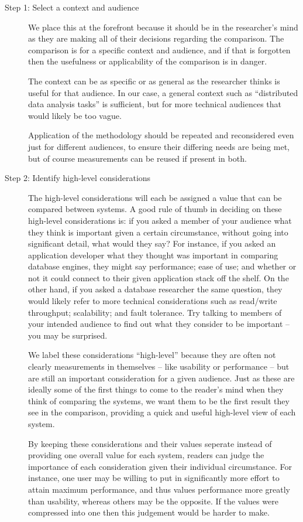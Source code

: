   \begin{description}
    \item[Step 1: Select a context and audience]
      We place this at the forefront because it should be in the researcher's mind as they are making all of their decisions regarding the comparison. The comparison is for a specific context and audience, and if that is forgotten then the usefulness or applicability of the comparison is in danger.
      
      The context can be as specific or as general as the researcher thinks is useful for that audience. In our case, a general context such as ``distributed data analysis tasks'' is sufficient, but for more technical audiences that would likely be too vague.
      
      Application of the methodology should be repeated and reconsidered even just for different audiences, to ensure their differing needs are being met, but of course measurements can be reused if present in both.

    \item[Step 2: Identify high-level considerations]
      The high-level considerations will each be assigned a value that can be compared between systems. A good rule of thumb in deciding on these high-level considerations is: if you asked a member of your audience what they think is important given a certain circumstance, without going into significant detail, what would they say? For instance, if you asked an application developer what they thought was important in comparing database engines, they might say performance; ease of use; and whether or not it could connect to their given application stack off the shelf. On the other hand, if you asked a database researcher the same question, they would likely refer to more technical considerations such as read/write throughput; scalability; and fault tolerance. Try talking to members of your intended audience to find out what they consider to be important -- you may be surprised.
      
      We label these considerations ``high-level'' because they are often not clearly measurements in themselves -- like usability or performance -- but are still an important consideration for a given audience. Just as these are ideally some of the first things to come to the reader's mind when they think of comparing the systems, we want them to be the first result they see in the comparison, providing a quick and useful high-level view of each system.
      
      By keeping these considerations and their values seperate instead of providing one overall value for each system, readers can judge the importance of each consideration given their individual circumstance. For instance, one user may be willing to put in significantly more effort to attain maximum performance, and thus values performance more greatly than usability, whereas others may be the opposite. If the values were compressed into one then this judgement would be harder to make.


\end{description}
